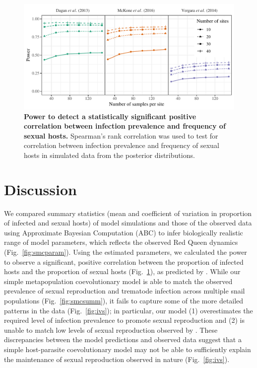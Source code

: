 \documentclass{article}\usepackage[]{graphicx}\usepackage[]{color}
\newcommand{\fref}[1]{Fig.~\ref{fig:#1}}
\begin{document}
\begin{figure}[!ht]
\includegraphics[width=\textwidth]{../fig/power.pdf}
\caption{{\bf Power to detect a statistically significant positive correlation between infection prevalence and frequency of sexual hosts.}
Spearman's rank correlation was used to test for correlation between infection prevalence and frequency of sexual hosts in simulated data from the posterior distributions.
}
\label{fig:power}
\end{figure}

\section{Discussion}

We compared summary statistics (mean and coefficient of variation in proportion of infected
and sexual hosts) of model simulations and those of the observed 
data using Approximate Bayesian Computation (ABC) to infer biologically realistic 
range of model parameters, which reflects the observed Red Queen dynamics (\fref{smcparam}).
Using the estimated parameters, we calculated the power to observe a significant,
positive correlation between the proportion of infected hosts and the proportion 
of sexual hosts (\fref{power}), as predicted by \cite{lively1992parthenogenesis}.
While our simple metapopulation coevolutionary model is able to match 
the observed prevalence of sexual reproduction and trematode infection 
across multiple snail populations (\fref{smcsumm}),
it fails to capture some of the more detailed patterns in the data (\fref{ivs});
in particular, our model (1) overestimates the required level of infection prevalence
to promote sexual reproduction and (2) is unable to match low levels of sexual reproduction 
observed by \cite{dagan2013clonal}.
These discrepancies between the model predictions and observed data suggest that a 
simple host-parasite coevolutionary model may not be able to sufficiently explain 
the maintenance of sexual reproduction observed in nature (\fref{ivs}).
\end{document}
